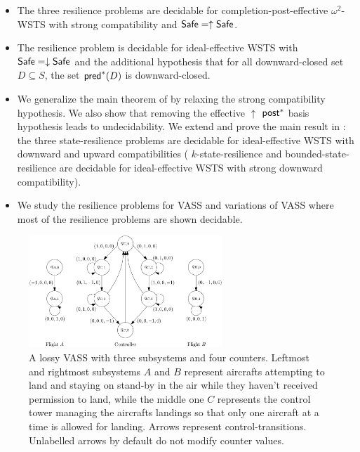 \begin{itemize}
\item The three resilience problems are decidable for completion-post-effective $\omega^2$-WSTS with strong compatibility and $\textsf{Safe} = \uparrow \textsf{Safe}$.

\item The resilience problem is decidable for ideal-effective WSTS with 
$\textsf{Safe}=\downarrow \textsf{Safe}$
and
the additional hypothesis that
for all downward-closed set $D \subseteq S$, the set $\textsf{pred}^*(D)$ is downward-closed.
%

\item We generalize the main theorem of \cite{DBLP:journals/corr/abs-2108-00889,DBLP:conf/gg/Ozkan22} by relaxing the strong compatibility hypothesis.
We also show that removing the effective 
$\uparrow$ $\textsf{post}^*$ basis hypothesis leads to undecidability. We extend and prove the main result in  \cite{DBLP:journals/corr/PrasadZ16} : the three state-resilience problems are decidable for ideal-effective WSTS with downward and upward compatibilities ({ $k$-state-resilience} and { bounded-state-resilience} are decidable for ideal-effective WSTS with strong downward compatibility).
%

\item We study the resilience problems for VASS and variations of VASS where most of the resilience problems are shown decidable.
\end{itemize}


 
\begin{center}
	\begin{figure}
			\hspace{2cm}
\includegraphics[width=0.65\textwidth]{FigureB}
	\caption{A lossy VASS with three subsystems and four counters. Leftmost and rightmost subsystems $A$ and $B$ represent aircrafts attempting to land and staying on stand-by in the air while they haven't received permission to land, while the middle one $C$ represents the control tower managing the aircrafts landings so that only one aircraft at a time is allowed for landing. Arrows represent control-transitions. Unlabelled arrows by default do not modify counter values.}
					\label{air control}
	\end{figure}
\end{center}

